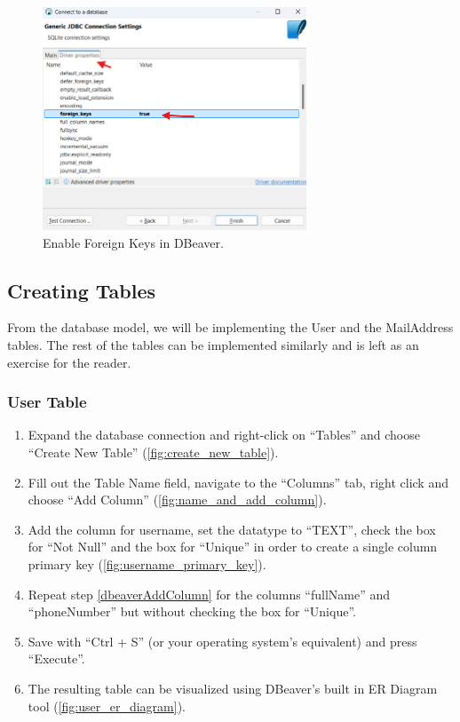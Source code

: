 \documentclass[a4paper,11pt,oneside]{article}
\begin{document}
\begin{sloppypar}
\begin{figure}[!htb]
  \centering
  \includegraphics[width=0.7\textwidth]{dbeaver/create_foreign_keys_enable.png}
  \caption{Enable Foreign Keys in DBeaver.}
  \label{fig:create_foreign_keys_enable}
\end{figure}



\subsection{Creating Tables}
\label{dbeaverCreatingTable}
From the database model, we will be implementing the User and the MailAddress tables. The rest of the tables can be implemented similarly and is left as an exercise for the reader.

\subsubsection{User Table}
\label{dbeaverUserTable}

\begin{enumerate}
  \item \label{dbeaverCreateTable} Expand the database connection and right-click on ``Tables'' and choose ``Create New Table'' (\autoref{fig:create_new_table}).
  \item Fill out the Table Name field, navigate to the ``Columns'' tab, right click and choose ``Add Column'' (\autoref{fig:name_and_add_column}).
  \item \label{dbeaverAddColumn} Add the column for username, set the datatype to ``TEXT'', check the box for ``Not Null'' and the box for ``Unique'' in order to create a single column primary key (\autoref{fig:username_primary_key}).
  \item Repeat step \ref{dbeaverAddColumn} for the columns ``fullName'' and ``phoneNumber'' but without checking the box for ``Unique''.
  \item Save with ``Ctrl + S'' (or your operating system's equivalent) and press ``Execute''.
  \item The resulting table can be visualized using DBeaver's built in ER Diagram tool (\autoref{fig:user_er_diagram}). 
\end{enumerate}


\end{sloppypar}
\end{document}
